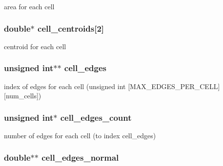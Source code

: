 area for each cell 

\hypertarget{structFVL_1_1CFVMesh2D__cuda_a05beb562a8dc14ea92dd8cc7b36f5131}{
\subsubsection[{cell\_\-centroids}]{\setlength{\rightskip}{0pt plus 5cm}double$\ast$ {\bf cell\_\-centroids}\mbox{[}2\mbox{]}}}
\label{dd/d46/structFVL_1_1CFVMesh2D__cuda_a05beb562a8dc14ea92dd8cc7b36f5131}


centroid for each cell 

\hypertarget{structFVL_1_1CFVMesh2D__cuda_a618dbcd16053ddd3695a69d156f9caea}{
\subsubsection[{cell\_\-edges}]{\setlength{\rightskip}{0pt plus 5cm}unsigned int$\ast$$\ast$ {\bf cell\_\-edges}}}
\label{dd/d46/structFVL_1_1CFVMesh2D__cuda_a618dbcd16053ddd3695a69d156f9caea}


index of edges for each cell (unsigned int \mbox{[}MAX\_\-EDGES\_\-PER\_\-CELL\mbox{]}\mbox{[}num\_\-cells\mbox{]}) 

\hypertarget{structFVL_1_1CFVMesh2D__cuda_a0272dc8071de98dff11b0109af7bdbed}{
\subsubsection[{cell\_\-edges\_\-count}]{\setlength{\rightskip}{0pt plus 5cm}unsigned int$\ast$ {\bf cell\_\-edges\_\-count}}}
\label{dd/d46/structFVL_1_1CFVMesh2D__cuda_a0272dc8071de98dff11b0109af7bdbed}


number of edges for each cell (to index cell\_\-edges) 

\hypertarget{structFVL_1_1CFVMesh2D__cuda_a8f355297b336ee7533f50e27b552216e}{
\subsubsection[{cell\_\-edges\_\-normal}]{\setlength{\rightskip}{0pt plus 5cm}double$\ast$$\ast$ {\bf cell\_\-edges\_\-normal}}}
\label{dd/d46/structFVL_1_1CFVMesh2D__cuda_a8f355297b336ee7533f50e27b552216e}


